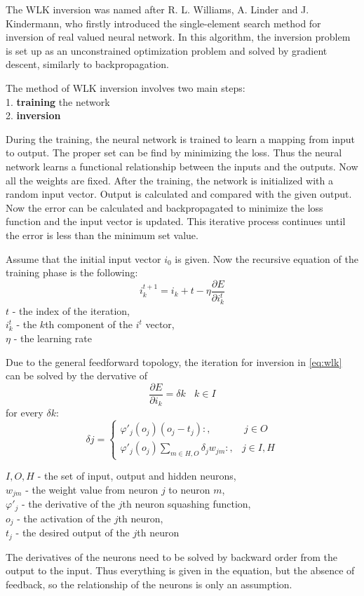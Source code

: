 The WLK inversion was named after R. L. Williams, A. Linder and J.
Kindermann, who firstly introduced the single-element search method for inversion of real valued neural network. In this algorithm, the inversion problem is set up as an unconstrained optimization problem and solved by gradient descent, similarly to backpropagation. \medskip

\noindent The method of WLK inversion involves two main steps: \\
1. \textbf{training} the network \\
2. \textbf{inversion}\medskip

During the training, the neural network is trained to learn a mapping from input to output. The proper set can be find by minimizing the loss. Thus the neural network learns a functional relationship between the inputs and the outputs. Now all the weights are fixed. After the training, the network is initialized with a random input vector. Output is calculated and compared with the given output. Now the error can be calculated and backpropagated to minimize the loss function and the input vector is updated. This iterative process continues until the error is less than the minimum set value.\medskip

Assume that the initial input vector $i_0$ is given. Now the recursive equation of the training phase is the following: 
\begin{equation} i_k^{t+1} = i_k+t - \eta \frac{\partial E}{\partial i_k^t} \label{eq:wlk} \end{equation} 
$t$ - the index of the iteration, \\
$i_k^t$ - the $k$th component of the $i^t$ vector, \\
$\eta$ - the learning rate \medskip

Due to the general feedforward topology, the iteration for inversion in \eqref{eq:wlk} can be solved by the dervative of 
$$ \frac{\partial E}{\partial i_k} = \delta k ~~~~ k \in I$$
for every $\delta k$:
$$ \delta j = \begin{cases} \varphi'_j(o_j)(o_j-t_j):, & ~ j \in O \\ 
\varphi'_j(o_j)\sum_{m\in H,O}\delta_j w_{jm}:, & j \in I, H \end{cases} $$

\noindent $I, O, H$ - the set of input, output and hidden neurons,\\
$w_{jm}$ - the weight value from neuron $j$ to neuron $m$,\\
$\varphi'_j$ - the derivative of the $j$th neuron squashing function,\\
$o_j$ - the activation of the $j$th neuron,\\
$t_j$ - the desired output of the $j$th neuron \medskip

The derivatives of the neurons need to be solved by backward order from the output to the input. Thus everything is given in the equation, but the absence of feedback, so the relationship of the neurons is only an assumption.

